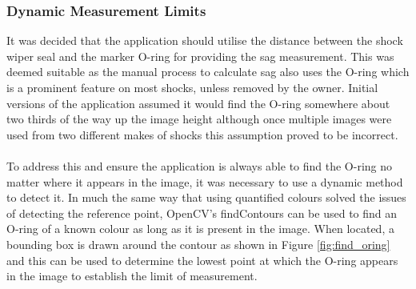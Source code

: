 		\subsubsection{Dynamic Measurement Limits}
			It was decided that the application should utilise the distance between the shock wiper seal and the marker O-ring for providing the sag measurement. This was deemed suitable as the manual process to calculate sag also uses the O-ring which is a prominent feature on most shocks, unless removed by the owner. Initial versions of the application assumed it would find the O-ring somewhere about two thirds of the way up the image height although once multiple images were used from two different makes of shocks this assumption proved to be incorrect.
			\\\\
			To address this and ensure the application is always able to find the O-ring no matter where it appears in the image, it was necessary to use a dynamic method to detect it. In much the same way that using quantified colours solved the issues of detecting the reference point, OpenCV’s findContours can be used to find an O-ring of a known colour as long as it is present in the image. When located, a bounding box is drawn around the contour as shown in Figure \ref{fig:find_oring} and this can be used to determine the lowest point at which the O-ring appears in the image to establish the limit of measurement.
